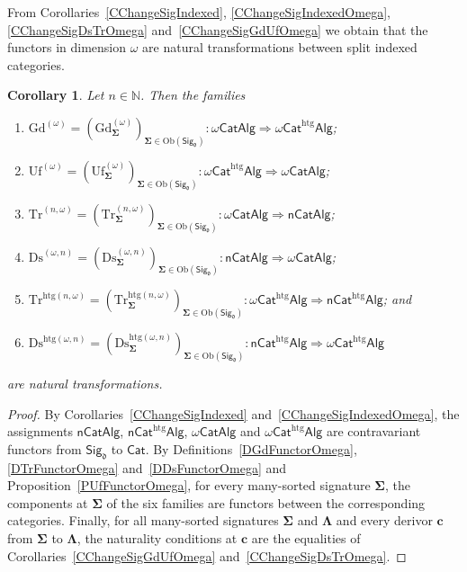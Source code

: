 \documentclass[a4paper, reqno]{amsbook}
\newcommand{\sig}[1]{\mathbf{#1}}             %
\newcommand{\htg}{\mathrm{htg}}                %
\newcommand{\Gd}{\mathrm{Gd}}
\newcommand{\Uf}{\mathrm{Uf}}
\newcommand{\Ds}{\mathrm{Ds}}
\newcommand{\Tr}{\mathrm{Tr}}
\theoremstyle{plain}
\newtheorem{corollary}[theorem]{Corollary}
\theoremstyle{definition}
\begin{document}
From Corollaries~\ref{CChangeSigIndexed}, \ref{CChangeSigIndexedOmega}, \ref{CChangeSigDsTrOmega} and~\ref{CChangeSigGdUfOmega} we obtain that the functors in dimension $\omega$ are natural transformations between split indexed categories.

\begin{corollary}\label{CChangeSigNatOmega}
Let $n\in\mathbb{N}$.
Then the families
\begin{enumerate}
	\item
	$\Gd^{(\omega)}=(\Gd^{(\omega)}_{\sig{\Sigma}})_{\sig{\Sigma}\in\mathrm{Ob}(\mathsf{Sig}_{\mathfrak{d}})}\colon\omega\mathsf{CatAlg}\Longrightarrow\omega\mathsf{Cat}^{\htg}\mathsf{Alg}$;

	\item
	$\Uf^{(\omega)}=(\Uf^{(\omega)}_{\sig{\Sigma}})_{\sig{\Sigma}\in\mathrm{Ob}(\mathsf{Sig}_{\mathfrak{d}})}\colon\omega\mathsf{Cat}^{\htg}\mathsf{Alg}\Longrightarrow\omega\mathsf{CatAlg}$;

	\item
	$\Tr^{(n,\omega)}=(\Tr^{(n,\omega)}_{\sig{\Sigma}})_{\sig{\Sigma}\in\mathrm{Ob}(\mathsf{Sig}_{\mathfrak{d}})}\colon\omega\mathsf{CatAlg}\Longrightarrow\mathsf{nCatAlg}$;

	\item
	$\Ds^{(\omega,n)}=(\Ds^{(\omega,n)}_{\sig{\Sigma}})_{\sig{\Sigma}\in\mathrm{Ob}(\mathsf{Sig}_{\mathfrak{d}})}\colon\mathsf{nCatAlg}\Longrightarrow\omega\mathsf{CatAlg}$;

	\item
	$\Tr^{\htg(n,\omega)}=(\Tr^{\htg(n,\omega)}_{\sig{\Sigma}})_{\sig{\Sigma}\in\mathrm{Ob}(\mathsf{Sig}_{\mathfrak{d}})}\colon\omega\mathsf{Cat}^{\htg}\mathsf{Alg}\Longrightarrow\mathsf{nCat}^{\htg}\mathsf{Alg}$; and

	\item
	$\Ds^{\htg(\omega,n)}=(\Ds^{\htg(\omega,n)}_{\sig{\Sigma}})_{\sig{\Sigma}\in\mathrm{Ob}(\mathsf{Sig}_{\mathfrak{d}})}\colon\mathsf{nCat}^{\htg}\mathsf{Alg}\Longrightarrow\omega\mathsf{Cat}^{\htg}\mathsf{Alg}$
\end{enumerate}
are natural transformations.
\end{corollary}
\begin{proof}
By Corollaries~\ref{CChangeSigIndexed} and~\ref{CChangeSigIndexedOmega}, the assignments $\mathsf{nCatAlg}$, $\mathsf{nCat}^{\htg}\mathsf{Alg}$, $\omega\mathsf{CatAlg}$ and $\omega\mathsf{Cat}^{\htg}\mathsf{Alg}$ are contravariant functors from $\mathsf{Sig}_{\mathfrak{d}}$ to $\mathsf{Cat}$.
By Definitions~\ref{DGdFunctorOmega}, \ref{DTrFunctorOmega} and~\ref{DDsFunctorOmega} and Proposition~\ref{PUfFunctorOmega}, for every many-sorted signature $\sig{\Sigma}$, the components at $\sig{\Sigma}$ of the six families are functors between the corresponding categories.
Finally, for all many-sorted signatures $\sig{\Sigma}$ and $\sig{\Lambda}$ and every derivor $\mathbf{c}$ from $\sig{\Sigma}$ to $\sig{\Lambda}$, the naturality conditions at $\mathbf{c}$ are the equalities of Corollaries~\ref{CChangeSigGdUfOmega} and~\ref{CChangeSigDsTrOmega}.
\end{proof}
\end{document}
